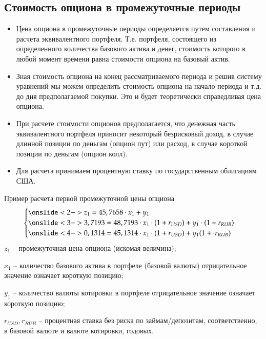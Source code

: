 \documentclass[_fin_decisions_lectures.tex]{subfiles}
\begin{document}
\subsection{Стоимость опциона в промежуточные периоды}
\begin{frame}{}
\begin{itemize}[<+->]
\item
Цена опциона в промежуточные периоды определяется путем составления и расчета эквивалентного портфеля. Т.е. портфеля, состоящего из определенного количества базового актива и денег, стоимость которого в любой момент времени равна стоимости опциона на базовый актив.
\item
Зная стоимость опциона на конец рассматриваемого периода и решив систему уравнений мы можем определить стоимость опциона на начало периода и т.д. до дня предполагаемой покупки. Это и будет теоретически справедливая цена опциона.

\end{itemize}
\end{frame}
\begin{frame}{}
\begin{itemize}[<+->]
\item
При расчете стоимости опционов предполагается, что денежная часть эквивалентного портфеля приносит некоторый безрисковый доход, в случае длинной позиции по деньгам (опцион пут) или расход, в случае короткой позиции по деньгам (опцион колл). 
\item
Для расчета принимаем процентную ставку по государственным облигациям США.
\end{itemize}
\end{frame}
\begin{frame}[shrink=10]{Пример расчета первой промежуточной цены опциона}
\begin{align*}
\begin{cases} 
\onslide<2->{z_1 = 45,7658 \cdot x_1 + y_1}\\ 
\onslide<3->{3,7193 = 48,7193 \cdot x_1 \cdot (1 + r_{USD}) + y_1 \cdot (1 + r_{RUB})}\\
\onslide<4->{0,1314 = 45,1314 \cdot x_1 \cdot (1 + r_{USD}) + y_1 (1 + \cdot r_{RUB})}
\end{cases}
\end{align*}
$z_1$ – промежуточная цена опциона (искомая величина);

$x_1$ – количество базового актива в портфеле (базовой валюты) отрицательное значение означает короткую позицию;

$y_1$ – количество валюты котировки в портфеле отрицательное значение означает короткую позицию;

$r_{USD},r_{RUB}$ – процентная ставка без риска по займам/депозитам, соответственно, в базовой валюте и валюте котировки, годовых.
\end{frame}
\end{document}
